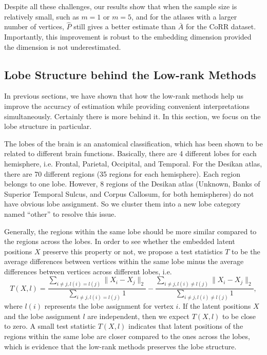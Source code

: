 Despite all these challenges, our results show that when the sample size is relatively small, such as $m=1$ or $m=5$, and for the atlases with a larger number of vertices, $\hat{P}$ still gives a better estimate than $\bar{A}$ for the CoRR dataset.
Importantly, this improvement is robust to the embedding dimension provided the dimension is not underestimated.



\subsection{Lobe Structure behind the Low-rank Methods}
\label{section:lobe_structure}
In previous sections, we have shown that how the low-rank methods help us improve the accuracy of estimation while providing convenient interpretations simultaneously. Certainly there is more behind it. In this section, we focus on the lobe structure in particular.

The lobes of the brain is an anatomical classification, which has been shown to be related to different brain functions. Basically, there are 4 different lobes for each hemisphere, i.e. Frontal, Parietal, Occipital, and Temporal.
For the Desikan atlas, there are 70 different regions (35 regions for each hemisphere). Each region belongs to one lobe. However, 8 regions of the Desikan atlas (Unknown, Banks of Superior Temporal Sulcus, and Corpus Callosum, for both hemispheres) do not have obvious lobe assignment. So we cluster them into a new lobe category named ``other'' to resolve this issue.

Generally, the regions within the same lobe should be more similar compared to the regions across the lobes. In order to see whether the embedded latent positions $X$ preserve this property or not, we propose a test statistics $T$ to be the average differences between vertices within the same lobe minus the average differences between vertices across different lobes, i.e.
\[
T(X, l) = \frac{\sum_{i \ne j, l(i) = l(j)} \|X_i - X_j \|_2}{\sum_{i \ne j, l(i) = l(j)} 1} -
\frac{\sum_{i \ne j, l(i) \ne l(j)} \|X_i - X_j \|_2}{\sum_{i \ne j, l(i) \ne l(j)} 1},
\]
where $l(i)$ represents the lobe assignment for vertex $i$. If the latent positions $X$ and the lobe assignment $l$ are independent, then we expect $T(X, l)$ to be close to zero. A small test statistic $T(X, l)$ indicates that latent positions of the regions within the same lobe are closer compared to the ones across the lobes, which is evidence that the low-rank methods preserves the lobe structure.

